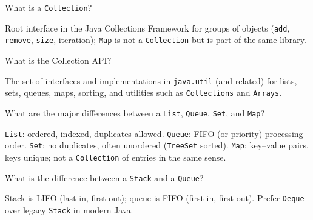 



\question[4]
What is a \texttt{Collection}?
\makeemptybox{1.15in}
\begin{solution}
  Root interface in the Java Collections Framework for groups of objects (\texttt{add}, \texttt{remove}, \texttt{size}, iteration); \texttt{Map} is not a \texttt{Collection} but is part of the same library.
\end{solution}

\question[4]
What is the Collection API?
\makeemptybox{1.2in}
\begin{solution}
  The set of interfaces and implementations in \texttt{java.util} (and related) for lists, sets, queues, maps, sorting, and utilities such as \texttt{Collections} and \texttt{Arrays}.
\end{solution}

\question[4]
What are the major differences between a \texttt{List}, \texttt{Queue}, \texttt{Set}, and \texttt{Map}?
\makeemptybox{1.65in}
\begin{solution}
  \texttt{List}: ordered, indexed, duplicates allowed. \texttt{Queue}: FIFO (or priority) processing order. \texttt{Set}: no duplicates, often unordered (\texttt{TreeSet} sorted). \texttt{Map}: key--value pairs, keys unique; not a \texttt{Collection} of entries in the same sense.
\end{solution}

\question[4]
What is the difference between a \texttt{Stack} and a \texttt{Queue}?
\makeemptybox{1.2in}
\begin{solution}
  Stack is LIFO (last in, first out); queue is FIFO (first in, first out). Prefer \texttt{Deque} over legacy \texttt{Stack} in modern Java.
\end{solution}

\newpage


